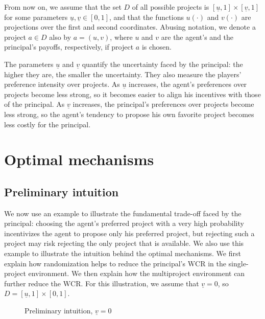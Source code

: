 \documentclass[12pt,english]{article}
\newcommand{\underv}{\underline{v}}
\newcommand{\under}{\underline}
\newcommand{\underu}{{\underline{u}}}
\theoremstyle{remark}
\theoremstyle{plain}
\theoremstyle{definition}
\newcommand{\wcr}{\mathrm{WCR}}
\begin{document}
From now on, we assume that the set $D$ of all possible projects is $[\under u,1]\times [\under v,1]$ for some parameters $\under u, \under v \in [0,1]$, and that the functions $u(\cdot)$ and $v(\cdot)$ are projections over the first and second coordinates. Abusing notation, we denote a project $a\in D$ also by $a=(u,v)$, where $u$ and $v$ are the agent's and the principal's payoffs, respectively, if project $a$ is chosen. 

The parameters $\underu$ and $\underv$ quantify the uncertainty faced by the principal: the higher they are, the smaller the uncertainty. They also measure the players' preference intensity over projects. As $\underu$ increases, the agent's preferences over projects become less strong, so it becomes easier to align his incentives with those of the principal. As $\underv$ increases, the principal's preferences over projects become less strong, so the agent's tendency to propose his own favorite project becomes less costly for the principal. 


\section{Optimal mechanisms}
\subsection{Preliminary intuition} \label{se:pre}

We now use an example to illustrate the fundamental trade-off faced by the principal: choosing the agent's preferred project with a very high probability incentivizes the agent to propose only his preferred project, but rejecting such a project may risk rejecting the only project that is available. We also use this example to illustrate the intuition behind the optimal mechanisms. We first explain how randomization helps to reduce the principal's $\wcr$ in the single-project environment. We then explain how the multiproject environment can further reduce the $\wcr$. For this illustration, we assume that $\under v = 0$, so $D=[\under u,1]\times [0,1]$.



\begin{figure}[htb!]
\begin{center}

\end{center}
\vspace{-6 mm}
\caption{Preliminary intuition, $\under v=0$}
\label{fg:intuition}
\end{figure}
\end{document}
